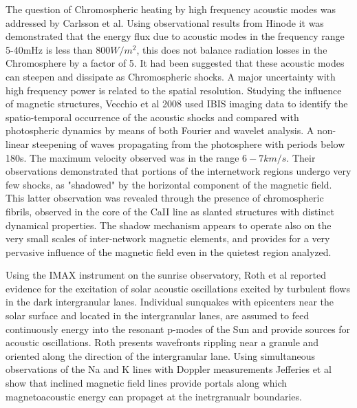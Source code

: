 \documentclass{aa}
\begin{document}
 The question of Chromospheric heating by high frequency acoustic modes was addressed by Carlsson et al\cite{Carlsson2007}. Using observational results from Hinode it was demonstrated that the energy flux due to acoustic modes in the frequency range 5-40mHz is less than $800W/m^2$, this does not balance radiation losses in the Chromosphere by a factor of 5. It had been suggested that these acoustic modes can steepen and dissipate as Chromospheric shocks. A major uncertainty  with high frequency power is related to the spatial resolution. Studying the influence of magnetic structures, Vecchio et al 2008  \cite{Cauzzi2008} used IBIS imaging data to identify the spatio-temporal occurrence of the acoustic shocks and  compared with photospheric dynamics by means of both Fourier and wavelet analysis. A non-linear steepening of waves propagating from the photosphere with periods below 180s. The maximum velocity observed was in the range $6-7km/s$. Their observations demonstrated that portions of the internetwork regions undergo very few shocks, as "shadowed" by the horizontal component of the magnetic field. This latter observation was revealed through the presence of chromospheric fibrils, observed in the core of the CaII line as slanted structures with distinct dynamical properties. The shadow mechanism appears to operate also on the very small scales of inter-network magnetic elements, and provides for a very pervasive influence of the magnetic field even in the quietest region analyzed. 

Using the IMAX instrument on the sunrise observatory, Roth et al  \cite{Roth2010}  reported evidence for the excitation of solar acoustic oscillations excited by turbulent flows  in the dark intergranular lanes.  Individual sunquakes with epicenters near the solar surface and located in the intergranular lanes, are assumed to feed continuously energy into the resonant p-modes of the Sun and provide sources for acoustic oscillations. Roth presents wavefronts rippling near a granule and oriented along the direction of the intergranular lane. Using simultaneous observations of the Na and K lines with Doppler measurements Jefferies et al \cite{Jefferies2006} show that inclined magnetic field lines provide portals along which magnetoacoustic energy can propaget at the inetrgranualr boundaries.
\end{document}
